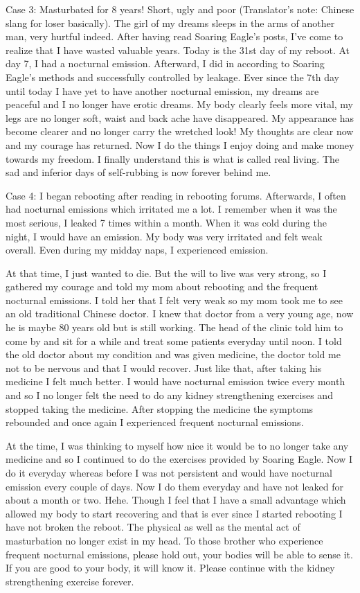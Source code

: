 \documentclass[
]{book}
\begin{document}
Case 3: Masturbated for 8 years! Short, ugly and poor (Translator's note: Chinese slang for loser basically). The girl of my dreams sleeps in the arms of another man, very hurtful indeed. After having read Soaring Eagle's posts, I've come to realize that I have wasted valuable years. Today is the 31st day of my reboot. At day 7, I had a nocturnal emission. Afterward, I did in according to Soaring Eagle's methods and successfully controlled by leakage. Ever since the 7th day until today I have yet to have another nocturnal emission, my dreams are peaceful and I no longer have erotic dreams. My body clearly feels more vital, my legs are no longer soft, waist and back ache have disappeared. My appearance has become clearer and no longer carry the wretched look! My thoughts are clear now and my courage has returned. Now I do the things I enjoy doing and make money towards my freedom. I finally understand this is what is called real living. The sad and inferior days of self-rubbing is now forever behind me.

Case 4: I began rebooting after reading in rebooting forums. Afterwards, I often had nocturnal emissions which irritated me a lot. I remember when it was the most serious, I leaked 7 times within a month. When it was cold during the night, I would have an emission. My body was very irritated and felt weak overall. Even during my midday naps, I experienced emission.

At that time, I just wanted to die. But the will to live was very strong, so I gathered my courage and told my mom about rebooting and the frequent nocturnal emissions. I told her that I felt very weak so my mom took me to see an old traditional Chinese doctor. I knew that doctor from a very young age, now he is maybe 80 years old but is still working. The head of the clinic told him to come by and sit for a while and treat some patients everyday until noon. I told the old doctor about my condition and was given medicine, the doctor told me not to be nervous and that I would recover. Just like that, after taking his medicine I felt much better. I would have nocturnal emission twice every month and so I no longer felt the need to do any kidney strengthening exercises and stopped taking the medicine. After stopping the medicine the symptoms rebounded and once again I experienced frequent nocturnal emissions.

At the time, I was thinking to myself how nice it would be to no longer take any medicine and so I continued to do the exercises provided by Soaring Eagle. Now I do it everyday whereas before I was not persistent and would have nocturnal emission every couple of days. Now I do them everyday and have not leaked for about a month or two. Hehe. Though I feel that I have a small advantage which allowed my body to start recovering and that is ever since I started rebooting I have not broken the reboot. The physical as well as the mental act of masturbation no longer exist in my head. To those brother who experience frequent nocturnal emissions, please hold out, your bodies will be able to sense it. If you are good to your body, it will know it. Please continue with the kidney strengthening exercise forever.
\end{document}
